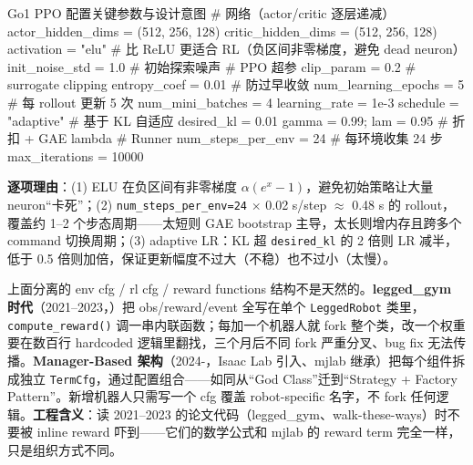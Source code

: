 \begin{codebox}[Python]{Go1 PPO 配置关键参数与设计意图}
# 网络（actor/critic 逐层递减）
actor_hidden_dims  = (512, 256, 128)
critic_hidden_dims = (512, 256, 128)
activation   = "elu"      # 比 ReLU 更适合 RL（负区间非零梯度，避免 dead neuron）
init_noise_std = 1.0      # 初始探索噪声
# PPO 超参
clip_param = 0.2          # surrogate clipping
entropy_coef = 0.01       # 防过早收敛
num_learning_epochs = 5   # 每 rollout 更新 5 次
num_mini_batches = 4
learning_rate = 1e-3
schedule = "adaptive"     # 基于 KL 自适应
desired_kl = 0.01
gamma = 0.99; lam = 0.95  # 折扣 + GAE lambda
# Runner
num_steps_per_env = 24    # 每环境收集 24 步
max_iterations = 10000
\end{codebox}

\textbf{逐项理由}：(1) ELU 在负区间有非零梯度 $\alpha(e^x-1)$，避免初始策略让大量 neuron“卡死”；(2) \verb|num_steps_per_env=24| $\times$ 0.02 s/step $\approx$ 0.48 s 的 rollout，覆盖约 1--2 个步态周期——太短则 GAE bootstrap 主导，太长则增内存且跨多个 command 切换周期；(3) adaptive LR：KL 超 \verb|desired_kl| 的 2 倍则 LR 减半，低于 0.5 倍则加倍，保证更新幅度不过大（不稳）也不过小（太慢）。

\begin{insight}\label{ins:rlmc-ql-evolution}
上面分离的 env cfg / rl cfg / reward functions 结构不是天然的。\textbf{legged\_gym 时代}（2021--2023，\cite{rudin2021minutes}）把 obs/reward/event 全写在单个 \verb|LeggedRobot| 类里，\verb|compute_reward()| 调一串内联函数；每加一个机器人就 fork 整个类，改一个权重要在数百行 hardcoded 逻辑里翻找，三个月后不同 fork 严重分叉、bug fix 无法传播。\textbf{Manager-Based 架构}（2024-，Isaac Lab 引入、mjlab 继承）把每个组件拆成独立 \verb|TermCfg|，通过配置组合——如同从“God Class”迁到“Strategy + Factory Pattern”。新增机器人只需写一个 cfg 覆盖 robot-specific 名字，不 fork 任何逻辑。\textbf{工程含义}：读 2021--2023 的论文代码（legged\_gym、walk-these-ways）时不要被 inline reward 吓到——它们的数学公式和 mjlab 的 reward term 完全一样，只是组织方式不同。
\end{insight}

